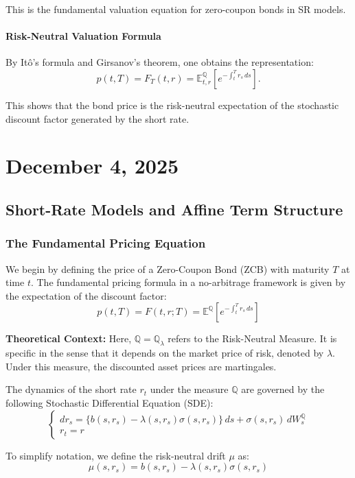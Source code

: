 \documentclass[12pt,a4paper]{article}
\theoremstyle{definition}
\newcommand{\Q}{\mathbb{Q}}
\newcommand{\E}{\mathbb{E}}
\begin{document}
This is the fundamental valuation equation for zero-coupon bonds in SR models.

\paragraph{Risk-Neutral Valuation Formula}

By Itô's formula and Girsanov's theorem, one obtains the representation:
\[
p(t, T) = F_T(t, r) = \mathbb{E}_{t,r}^{\mathbb{Q}}\!\left[e^{-\int_t^T r_s \, ds}\right].
\]

This shows that the bond price is the risk-neutral expectation of the stochastic discount factor generated by the short rate.

\newpage
\section{December 4, 2025}

\subsection{Short-Rate Models and Affine Term Structure}

\subsubsection{The Fundamental Pricing Equation}

We begin by defining the price of a Zero-Coupon Bond (ZCB) with maturity $T$ at time $t$. The fundamental pricing formula in a no-arbitrage framework is given by the expectation of the discount factor:
\[
p(t,T) = F(t,r;T) = \E^{\Q}\left[e^{-\int_t^T r_s \, ds}\right]
\]

\textbf{Theoretical Context:} Here, $\Q = \Q_\lambda$ refers to the Risk-Neutral Measure. It is specific in the sense that it depends on the market price of risk, denoted by $\lambda$. Under this measure, the discounted asset prices are martingales.

The dynamics of the short rate $r_t$ under the measure $\Q$ are governed by the following Stochastic Differential Equation (SDE):
\[
\begin{cases}
dr_s = \{b(s,r_s) - \lambda(s,r_s)\sigma(s,r_s)\}\,ds + \sigma(s,r_s)\,dW_s^{\Q} \\
r_t = r
\end{cases}
\]

To simplify notation, we define the risk-neutral drift $\mu$ as:
\[
\mu(s,r_s) = b(s,r_s) - \lambda(s,r_s)\sigma(s,r_s)
\]
\end{document}
